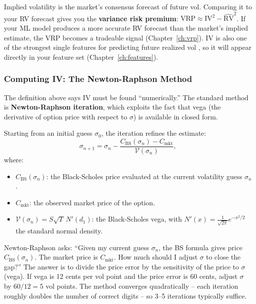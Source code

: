 \begin{projectconnection}
Implied volatility is the market's consensus forecast of future vol.
Comparing it to your RV forecast gives you the \textbf{variance risk premium}: $\text{VRP} \approx \text{IV}^2 - \widehat{\text{RV}}^2$.
If your ML model produces a more accurate RV forecast than the market's implied estimate, the VRP becomes a tradeable signal (Chapter~\ref{ch:vrp}).
IV is also one of the strongest single features for predicting future realized vol \citep{Gu2020}, so it will appear directly in your feature set (Chapter~\ref{ch:features}).
\end{projectconnection}

\subsubsection*{Computing IV: The Newton-Raphson Method}

The definition above says IV must be found ``numerically.''
The standard method is \textbf{Newton-Raphson iteration}, which exploits the fact that vega (the derivative of option price with respect to $\sigma$) is available in closed form.

Starting from an initial guess $\sigma_0$, the iteration refines the estimate:
\begin{equation}\label{eq:newton-raphson-iv}
\sigma_{n+1} = \sigma_n - \frac{C_{\text{BS}}(\sigma_n) - C_{\text{mkt}}}{\mathcal{V}(\sigma_n)},
\end{equation}
where:
\begin{itemize}[nosep]
  \item $C_{\text{BS}}(\sigma_n)$: the Black-Scholes price evaluated at the current volatility guess $\sigma_n$.
  \item $C_{\text{mkt}}$: the observed market price of the option.
  \item $\mathcal{V}(\sigma_n) = S\sqrt{T}\,N'(d_1)$: the Black-Scholes vega, with $N'(x) = \frac{1}{\sqrt{2\pi}}e^{-x^2/2}$ the standard normal density.
\end{itemize}

\begin{intuition}
Newton-Raphson asks: ``Given my current guess $\sigma_n$, the BS formula gives price $C_{\text{BS}}(\sigma_n)$.
The market price is $C_{\text{mkt}}$.
How much should I adjust $\sigma$ to close the gap?''
The answer is to divide the price error by the sensitivity of the price to $\sigma$ (vega).
If vega is 12 cents per vol point and the price error is 60 cents, adjust $\sigma$ by $60/12 = 5$ vol points.
The method converges quadratically -- each iteration roughly doubles the number of correct digits -- so 3--5 iterations typically suffice.
\end{intuition}


